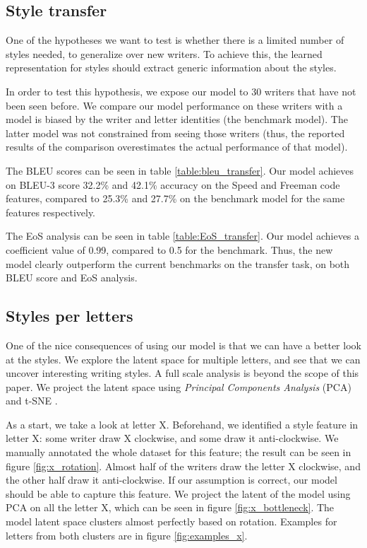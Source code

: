   \subsection{Style transfer}
  \par One of the hypotheses we want to test is whether there is a limited number of styles needed, to generalize over new writers. To achieve this, the learned representation for styles should extract generic information about the styles.

  \par In order to test this hypothesis, we expose our model to 30 writers that have not been seen before. We compare our model performance on these writers with a model is biased by the writer and letter identities (the benchmark model). The latter model was not constrained from seeing those writers (thus, the reported results of the comparison overestimates the actual performance of that model).

  \par The BLEU scores can be seen in table \ref{table:bleu_transfer}. Our model achieves on BLEU-3 score 32.2\% and 42.1\% accuracy on the Speed and Freeman code features, compared to 25.3\% and 27.7\% on the benchmark model for the same features respectively.
  \par The EoS analysis can be seen in table \ref{table:EoS_transfer}. Our model achieves a coefficient value of 0.99, compared to 0.5 for the benchmark.
  Thus, the new model clearly outperform the current benchmarks on the transfer task, on both BLEU score and EoS analysis.

  \subsection{Styles per letters} \label{ch:framework_sec:styleperletter}
  \par One of the nice consequences of using our model is that we can have a better look at the styles. We explore the latent space for multiple letters, and see that we can uncover interesting writing styles. A full scale analysis is beyond the scope of this paper. We project the latent space using \textit{Principal Components Analysis} (PCA) \citep{jolliffe2011principal} and t-SNE \citep{maaten2008visualizing}.

  \par As a start, we take a look at letter X. Beforehand, we identified a style feature in letter X: some writer draw X clockwise, and some draw it anti-clockwise. We manually annotated the whole dataset for this feature; the result can be seen in figure \ref{fig:x_rotation}. Almost half of the writers draw the letter X clockwise, and the other half draw it anti-clockwise. If our assumption is correct, our model should be able to capture this feature. We project the latent  of the model using PCA on all the letter X, which can be seen in figure \ref{fig:x_bottleneck}. The model latent space clusters almost perfectly based on rotation. Examples for letters from both clusters are in figure \ref{fig:examples_x}.

